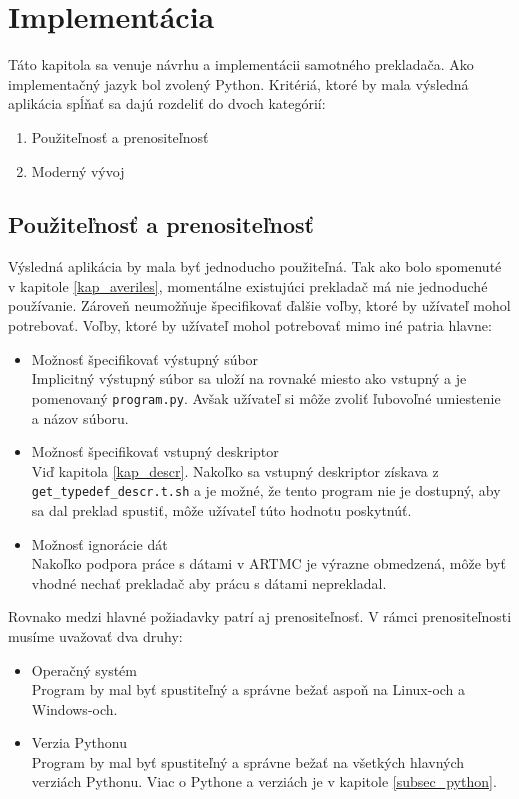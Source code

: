 \chapter{Implementácia}
\label{kap_imp}
Táto kapitola sa venuje návrhu a implementácii samotného prekladača.
Ako implementačný jazyk bol zvolený Python. Kritériá, ktoré by mala výsledná
aplikácia spĺňať sa dajú rozdeliť do dvoch kategórií:
\begin{enumerate}
    \item Použiteľnosť a prenositeľnosť
    \item Moderný vývoj
\end{enumerate}

\section{Použiteľnosť a prenositeľnosť}
Výsledná aplikácia by mala byť jednoducho použiteľná. Tak ako bolo spomenuté v
kapitole \ref{kap_averiles}, momentálne existujúci prekladač má nie jednoduché používanie. Zároveň
neumožňuje špecifikovať ďalšie voľby, ktoré by užívateľ mohol potrebovať. Voľby,
ktoré by užívateľ mohol potrebovať mimo iné patria hlavne:
\begin{itemize}
    \item Možnosť špecifikovať výstupný súbor\\
        Implicitný výstupný súbor sa uloží na rovnaké miesto ako vstupný a je
        pomenovaný \texttt{program.py}. Avšak užívateľ si môže zvoliť ľubovoľné umiestenie
        a názov súboru.
    \item Možnosť špecifikovať vstupný deskriptor\\
        Viď kapitola \ref{kap_descr}. Nakoľko sa vstupný deskriptor získava z \texttt{get\_typedef\_descr.t.sh} a je
        možné, že tento program nie je dostupný, aby sa dal preklad spustiť, môže
        užívateľ túto hodnotu poskytnúť.
    \item Možnosť ignorácie dát\\
        Nakoľko podpora práce s dátami v ARTMC je výrazne obmedzená, môže byť
        vhodné nechať prekladač aby prácu s dátami neprekladal.
\end{itemize}

Rovnako medzi hlavné požiadavky patrí aj prenositeľnosť. V rámci prenositeľnosti
musíme uvažovať dva druhy:
\begin{itemize}
    \item Operačný systém\\
        Program by mal byť spustiteľný a správne bežať aspoň na Linux-och a Windows-och.
    \item Verzia Pythonu\\
        Program by mal byť spustiteľný a správne bežať na všetkých hlavných verziách Pythonu.
        Viac o Pythone a verziách je v kapitole \ref{subsec_python}.
\end{itemize}

